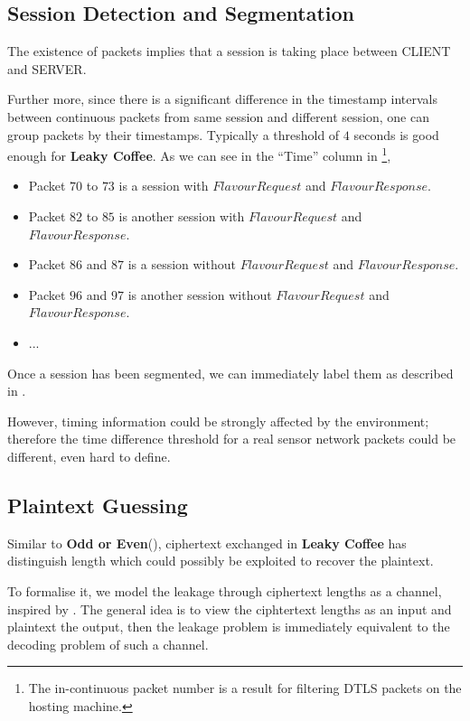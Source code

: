 \subsection{Session Detection and Segmentation}
The existence of packets implies that a session is taking place between CLIENT and SERVER.

Further more, since there is a significant difference in the timestamp intervals between continuous packets from same session and different session, one can group packets by their timestamps. Typically a threshold of $4$ seconds is good enough for \textbf{Leaky Coffee}. As we can see in the “Time” column in \footnote{The in-continuous packet number is a result for filtering DTLS packets on the hosting machine.},
\begin{itemize}
\item Packet $70$ to $73$ is a session with $FlavourRequest$ and $FlavourResponse$.
\item Packet $82$ to $85$ is another session with $FlavourRequest$ and $FlavourResponse$.
\item Packet $86$ and $87$ is a session without $FlavourRequest$ and $FlavourResponse$.
\item Packet $96$ and $97$ is another session without $FlavourRequest$ and $FlavourResponse$.
\item ...
\end{itemize}

Once a session has been segmented, we can immediately label them as described in .

However,  timing information could be strongly affected by the environment; therefore the time difference threshold for a real sensor network packets could be different, even hard to define.

\subsection{Plaintext Guessing} \label{Sec: Plaintext Guessing}
Similar to \textbf{Odd or Even}(), ciphertext exchanged in \textbf{Leaky Coffee} has distinguish length which could possibly be exploited to recover the plaintext.

To formalise it, we model the leakage through ciphertext lengths as a channel\cite{Information_Theory}, inspired by \cite{Web2}. The general idea is to view the ciphtertext lengths as an input and plaintext the output, then the leakage problem is immediately equivalent  to the decoding problem of such a channel. 

